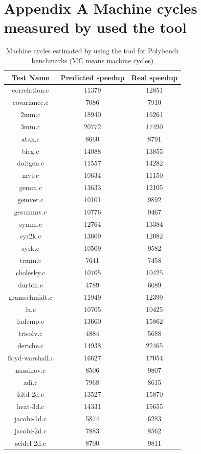 \begin{table}
\section{\fontsize{12}{15}\selectfont Appendix A Machine cycles measured by used the tool}
\begin{center}
\caption{Machine cycles estimated by using the tool for Polybench benchmarks (MC means machine cycles)}
\vspace{0.2cm}
\begin{tabular}{ |c|c|c| } 
 \hline
Test Name & Predicted speedup & Real speedup \\
 \hline
 correlation.c & 11379 & 12851 \\
 \hline
  covariance.c & 7086 & 7910 \\
 \hline
  2mm.c & 18940 & 16261 \\
 \hline
  3mm.c & 20772 & 17490 \\
 \hline
  atax.c & 8660 & 8791 \\
 \hline
  bicg.c & 14088 & 13855 \\
 \hline
  doitgen.c & 11557 & 14282 \\
 \hline
  mvt.c & 10634 & 11150 \\
 \hline
  gemm.c & 13633 & 12105 \\
 \hline
  gemver.c & 10101 & 9892 \\
 \hline
  gesummv.c & 10776 & 9467 \\
 \hline
  symm.c & 12764 & 13384 \\
 \hline
  syr2k.c & 13609 & 12082 \\
 \hline
  syrk.c & 10509 & 9582 \\
 \hline
  trmm.c & 7641 & 7458 \\
 \hline
  cholesky.c & 10705 & 10425 \\
 \hline
  durbin.c & 4789 & 6089 \\
 \hline
  gramschmidt.c & 11949 & 12399 \\
 \hline
  lu.c & 10705 & 10425 \\
 \hline
  ludcmp.c & 13660 & 15862 \\
 \hline
  trisolv.c & 4884 & 5688 \\
 \hline
  deriche.c & 14938 & 22465 \\
 \hline
  floyd-warshall.c & 16627 & 17054 \\
 \hline
  nussinov.c & 8506 & 9807 \\
 \hline
  adi.c & 7968 & 8615 \\
 \hline
  fdtd-2d.c & 13527 & 15870 \\
 \hline
  heat-3d.c & 14331 & 15655 \\
 \hline
  jacobi-1d.c & 5874 & 6283 \\
 \hline
  jacobi-2d.c & 7883 & 8562 \\
 \hline
  seidel-2d.c & 8700 & 9811 \\
 \hline
\end{tabular}
\end{center}
\end{table}

